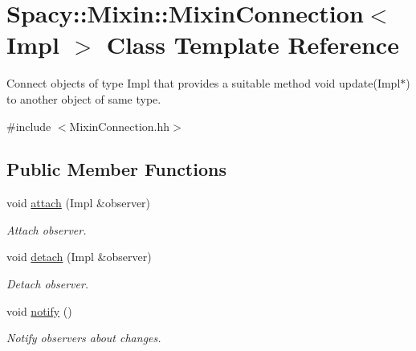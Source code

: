 \hypertarget{classSpacy_1_1Mixin_1_1MixinConnection}{\section{\-Spacy\-:\-:\-Mixin\-:\-:\-Mixin\-Connection$<$ \-Impl $>$ \-Class \-Template \-Reference}
\label{classSpacy_1_1Mixin_1_1MixinConnection}
}


\-Connect objects of type \-Impl that provides a suitable method void update(\-Impl$\ast$) to another object of same type.  




{\ttfamily \#include $<$\-Mixin\-Connection.\-hh$>$}

\subsection*{\-Public \-Member \-Functions}
\begin{DoxyCompactItemize}
\item 
\hypertarget{classSpacy_1_1Mixin_1_1MixinConnection_abb5520ee6b22dd993d78f142939a1ed4}{void \hyperlink{classSpacy_1_1Mixin_1_1MixinConnection_abb5520ee6b22dd993d78f142939a1ed4}{attach} (\-Impl \&observer)}\label{classSpacy_1_1Mixin_1_1MixinConnection_abb5520ee6b22dd993d78f142939a1ed4}

\begin{DoxyCompactList}\small\item\em \-Attach observer. \end{DoxyCompactList}\item 
\hypertarget{classSpacy_1_1Mixin_1_1MixinConnection_adda739590c487679c26f60e50aedb73f}{void \hyperlink{classSpacy_1_1Mixin_1_1MixinConnection_adda739590c487679c26f60e50aedb73f}{detach} (\-Impl \&observer)}\label{classSpacy_1_1Mixin_1_1MixinConnection_adda739590c487679c26f60e50aedb73f}

\begin{DoxyCompactList}\small\item\em \-Detach observer. \end{DoxyCompactList}\item 
\hypertarget{classSpacy_1_1Mixin_1_1MixinConnection_a1ddeaa78a3bb4a38c2cca36d1f99fe36}{void \hyperlink{classSpacy_1_1Mixin_1_1MixinConnection_a1ddeaa78a3bb4a38c2cca36d1f99fe36}{notify} ()}\label{classSpacy_1_1Mixin_1_1MixinConnection_a1ddeaa78a3bb4a38c2cca36d1f99fe36}

\begin{DoxyCompactList}\small\item\em \-Notify observers about changes. \end{DoxyCompactList}\end{DoxyCompactItemize}


